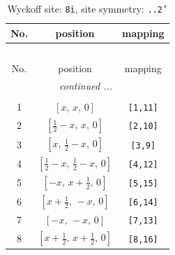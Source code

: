 \documentclass[fleqn,8pt]{jsarticle}
\begin{document}
\renewcommand{\arraystretch}{1.2}
\begin{longtable}{ccc}
\caption{Wyckoff site: {\tt 8i}, site symmetry: {\tt ..2'}}
 \\
 \hline \hline
No. & position & mapping \\ \hline \endfirsthead

\multicolumn{2}{l}{\tablename\ \thetable{}} \\
 \hline \hline
No. & position & mapping \\ \hline \endhead

 \hline \hline
\multicolumn{2}{r}{\footnotesize\it continued ...} \\ \endfoot

 \hline \hline
\multicolumn{2}{r}{} \\ \endlastfoot

1 & $\left[ x,\, x,\, 0 \right]$ & {\tt [1,11]} \\ \hline
2 & $\left[ \frac{1}{2} - x,\, x,\, 0 \right]$ & {\tt [2,10]} \\ \hline
3 & $\left[ x,\, \frac{1}{2} - x,\, 0 \right]$ & {\tt [3,9]} \\ \hline
4 & $\left[ \frac{1}{2} - x,\, \frac{1}{2} - x,\, 0 \right]$ & {\tt [4,12]} \\ \hline
5 & $\left[ - x,\, x + \frac{1}{2},\, 0 \right]$ & {\tt [5,15]} \\ \hline
6 & $\left[ x + \frac{1}{2},\, - x,\, 0 \right]$ & {\tt [6,14]} \\ \hline
7 & $\left[ - x,\, - x,\, 0 \right]$ & {\tt [7,13]} \\ \hline
8 & $\left[ x + \frac{1}{2},\, x + \frac{1}{2},\, 0 \right]$ & {\tt [8,16]} \\
\end{longtable}
\renewcommand{\arraystretch}{1.2}
\end{document}
